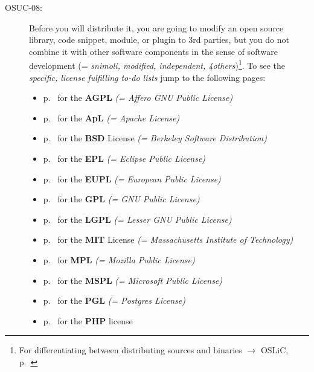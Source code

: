 \begin{description}
\item[OSUC-08:]\label{OSUC-08-DEF} Before you will distribute it, you are going
to modify an open source library, code snippet, module, or plugin to 3rd
parties, but you do not combine it with other software components in the sense
of software development (= \textit{snimoli, modified, independent,
4others})\footnote{For differentiating between distributing sources and binaries
$\rightarrow$ OSLiC, p.\ \pageref{sec:SourceBinaryDifference}}. To see the
\textit{specific, license fulfilling to-do lists} jump to the following pages:
  \begin{itemize}
    \item p.\ \pageref{OSUC-08-AGPL} for the \textbf{AGPL}
      \textit{(= Affero GNU Public License)} 
    \item p.\ \pageref{OSUC-08-Apache20} for the \textbf{ApL}
      \textit{(= Apache License)}
    \item p.\ \pageref{OSUC-08-BSD} for the \textbf{BSD} License
      \textit{(= Berkeley Software Distribution)}
    \item p.\ \pageref{OSUC-08-EPL} for the \textbf{EPL}
      \textit{(= Eclipse Public License)}     
    \item p.\ \pageref{OSUC-08-EUPL} for the \textbf{EUPL}
      \textit{(= European Public License)} 
    \item p.\ \pageref{OSUC-08-GPL} for the \textbf{GPL}
       \textit{(= GNU Public License)} 
    \item p.\ \pageref{OSUC-08-LGPL} for the \textbf{LGPL}
      \textit{(= Lesser GNU Public License)}           
    \item p.\ \pageref{OSUC-08-MIT} for the \textbf{MIT} License
       \textit{(= Massachusetts Institute of Technology)} 
    \item p.\ \pageref{OSUC-08-MPL} for \textbf{MPL}
      \textit{(= Mozilla Public License)}     
    \item p.\ \pageref{OSUC-08-MsPL} for the \textbf{MSPL}
      \textit{(= Microsoft Public License)} 
    \item p.\ \pageref{OSUC-08-PGL} for the \textbf{PGL}
      \textit{(= Postgres License)} 
    \item p.\ \pageref{OSUC-08-PHP} for the \textbf{PHP} license 
  \end{itemize}



\end{description}

